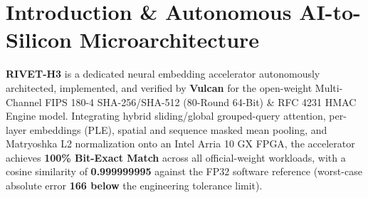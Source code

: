 \documentclass[11pt,a4paper]{article}
\begin{document}
\section{Introduction \& Autonomous AI-to-Silicon Microarchitecture}

\textbf{RIVET-H3} is a dedicated neural embedding accelerator autonomously architected, implemented, and verified by \textbf{Vulcan} for the open-weight Multi-Channel FIPS 180-4 SHA-256/\allowbreak{}SHA-512 (\allowbreak{}80-Round 64-Bit)\allowbreak{} \& RFC 4231 HMAC Engine model. Integrating hybrid sliding/global grouped-query attention, per-layer embeddings (PLE), spatial and sequence masked mean pooling, and Matryoshka L2 normalization onto an Intel Arria 10 GX FPGA, the accelerator achieves \textbf{100\% Bit-Exact Match} across all official-weight workloads, with a cosine similarity of \textbf{0.999999995} against the FP32 software reference (worst-case absolute error \textbf{166\texttimes{} below} the engineering tolerance limit).

\vspace{2pt}
\end{document}
